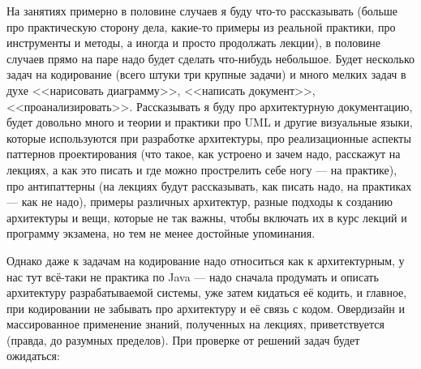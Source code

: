 \documentclass[a5paper]{article}
\begin{document}
На занятиях примерно в половине случаев я буду что-то рассказывать (больше про практическую сторону дела, какие-то примеры из реальной практики, про инструменты и методы, а иногда и просто продолжать лекции), в половине случаев прямо на паре надо будет сделать что-нибудь небольшое. Будет несколько задач на кодирование (всего штуки три крупные задачи) и много мелких задач в духе <<нарисовать диаграмму>>, <<написать документ>>, <<проанализировать>>. Рассказывать я буду про архитектурную документацию, будет довольно много и теории и практики про UML и другие визуальные языки, которые используются при разработке архитектуры, про реализационные аспекты паттернов проектирования (что такое, как устроено и зачем надо, расскажут на лекциях, а как это писать и где можно прострелить себе ногу --- на практике), про антипаттерны (на лекциях будут рассказывать, как писать надо, на практиках --- как не надо), примеры различных архитектур, разные подходы к созданию архитектуры и вещи, которые не так важны, чтобы включать их в курс лекций и программу экзамена, но тем не менее достойные упоминания.

Однако даже к задачам на кодирование надо относиться как к архитектурным, у нас тут всё-таки не практика по Java --- надо сначала продумать и описать архитектуру разрабатываемой системы, уже затем кидаться её кодить, и главное, при кодировании не забывать про архитектуру и её связь с кодом. Овердизайн и массированное применение знаний, полученных на лекциях, приветствуется (правда, до разумных пределов). При проверке от решений задач будет ожидаться:
\end{document}
